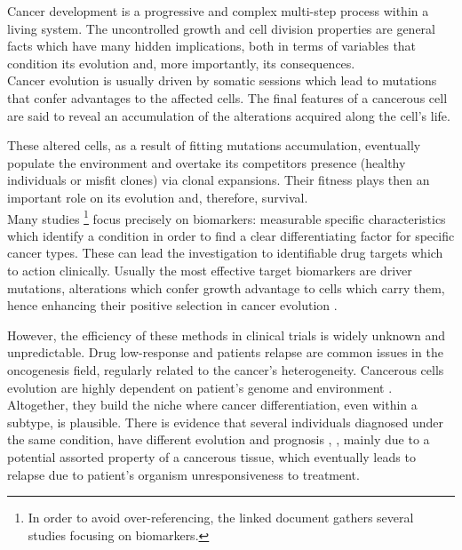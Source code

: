 Cancer development is a progressive and complex multi-step process within a living system. The uncontrolled growth and cell division properties are general facts which have many hidden implications, both in terms of variables that condition its evolution and, more importantly, its consequences.
\\

Cancer evolution is usually driven by somatic sessions which lead to mutations that confer advantages to the affected cells. The final features of a cancerous cell are said to reveal an accumulation of the alterations acquired along the cell’s life.

These altered cells, as a result of fitting mutations accumulation, eventually populate the environment and overtake its competitors presence (healthy individuals or misfit clones) via clonal expansions. Their fitness plays then an important role on its evolution and, therefore, survival.
\\

Many studies \cite{Rifai2006ProteinUtility}\footnote{In order to avoid over-referencing, the linked document gathers several studies focusing on biomarkers.} focus precisely on biomarkers: measurable specific characteristics which identify a condition in order to find a clear differentiating factor for specific cancer types. These can lead the investigation to identifiable drug targets which to action clinically. Usually the most effective target biomarkers are driver mutations, 
alterations which confer growth advantage to cells which carry them, hence enhancing their positive selection in cancer evolution \cite{Stratton2009TheGenome}.

However, the efficiency of these methods in clinical trials is widely unknown and unpredictable. Drug low-response and patients relapse are common issues in the oncogenesis field, regularly related to the cancer’s heterogeneity. Cancerous cells evolution are highly dependent on patient’s genome and environment \cite{Yates2012EvolutionGenome}. Altogether, they build the niche where cancer differentiation, even within a subtype, is plausible. There is evidence that several individuals diagnosed under the same condition, have different evolution and prognosis \cite{Gao2016LossTherapy}, \cite{Zaretsky2016MutationsMelanoma}, mainly due to a potential assorted property of a cancerous tissue, which eventually leads to relapse due to patient's organism unresponsiveness to treatment.
\\

